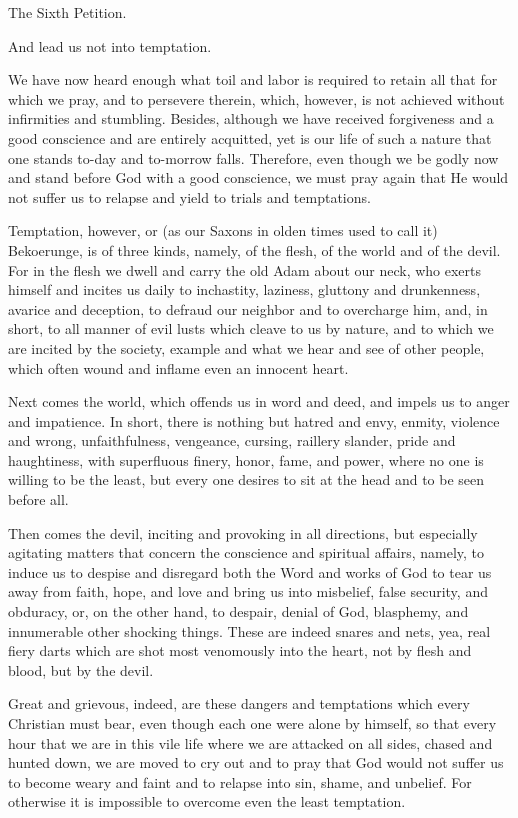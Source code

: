  The Sixth Petition.

And lead us not into temptation.

We have now heard enough what toil and labor is required to retain all
that for which we pray, and to persevere therein, which, however, is
not achieved without infirmities and stumbling. Besides, although we
have received forgiveness and a good conscience and are entirely
acquitted, yet is our life of such a nature that one stands to-day and
to-morrow falls. Therefore, even though we be godly now and stand
before God with a good conscience, we must pray again that He would not
suffer us to relapse and yield to trials and temptations.

Temptation, however, or (as our Saxons in olden times used to call it)
Bekoerunge, is of three kinds, namely, of the flesh, of the world and
of the devil. For in the flesh we dwell and carry the old Adam about
our neck, who exerts himself and incites us daily to inchastity,
laziness, gluttony and drunkenness, avarice and deception, to defraud
our neighbor and to overcharge him, and, in short, to all manner of
evil lusts which cleave to us by nature, and to which we are incited by
the society, example and what we hear and see of other people, which
often wound and inflame even an innocent heart.

Next comes the world, which offends us in word and deed, and impels us
to anger and impatience. In short, there is nothing but hatred and
envy, enmity, violence and wrong, unfaithfulness, vengeance, cursing,
raillery slander, pride and haughtiness, with superfluous finery,
honor, fame, and power, where no one is willing to be the least, but
every one desires to sit at the head and to be seen before all.

Then comes the devil, inciting and provoking in all directions, but
especially agitating matters that concern the conscience and spiritual
affairs, namely, to induce us to despise and disregard both the Word
and works of God to tear us away from faith, hope, and love and bring
us into misbelief, false security, and obduracy, or, on the other hand,
to despair, denial of God, blasphemy, and innumerable other shocking
things. These are indeed snares and nets, yea, real fiery darts which
are shot most venomously into the heart, not by flesh and blood, but by
the devil.

Great and grievous, indeed, are these dangers and temptations which
every Christian must bear, even though each one were alone by himself,
so that every hour that we are in this vile life where we are attacked
on all sides, chased and hunted down, we are moved to cry out and to
pray that God would not suffer us to become weary and faint and to
relapse into sin, shame, and unbelief. For otherwise it is impossible
to overcome even the least temptation.

